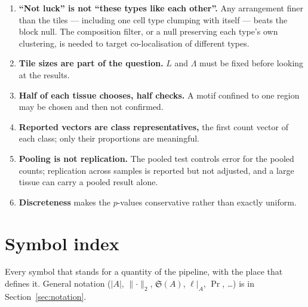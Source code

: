 \documentclass[11pt,a4paper]{article}
\theoremstyle{remark}
\newcommand{\lab}{\ell}
\newcommand{\Sym}{\mathfrak{S}}
\begin{document}
\begin{enumerate}[itemsep=3pt]
  \item \textbf{``Not luck'' is not ``these types like each other''.} Any
        arrangement finer than the tiles --- including one cell type clumping
        with itself --- beats the block null. The composition filter, or a null
        preserving each type's own clustering, is needed to target
        co-localisation of different types.
  \item \textbf{Tile sizes are part of the question.} $L$ and $\Lambda$ must be
        fixed before looking at the results.
  \item \textbf{Half of each tissue chooses, half checks.} A motif confined to
        one region may be chosen and then not confirmed.
  \item \textbf{Reported vectors are class representatives,} the first count
        vector of each class; only their proportions are meaningful.
  \item \textbf{Pooling is not replication.} The pooled test controls error for
        the pooled counts; replication across samples is reported but not
        adjusted, and a large tissue can carry a pooled result alone.
  \item \textbf{Discreteness} makes the $p$-values conservative rather than
        exactly uniform.
\end{enumerate}

\appendix
\section{Symbol index}
\label{app:symbols}

Every symbol that stands for a quantity of the pipeline, with the place that
defines it. General notation ($|A|$, $\lVert\cdot\rVert_2$, $\Sym(A)$,
$\lab|_A$, $\Pr$, \dots) is in Section~\ref{sec:notation}.
\end{document}
